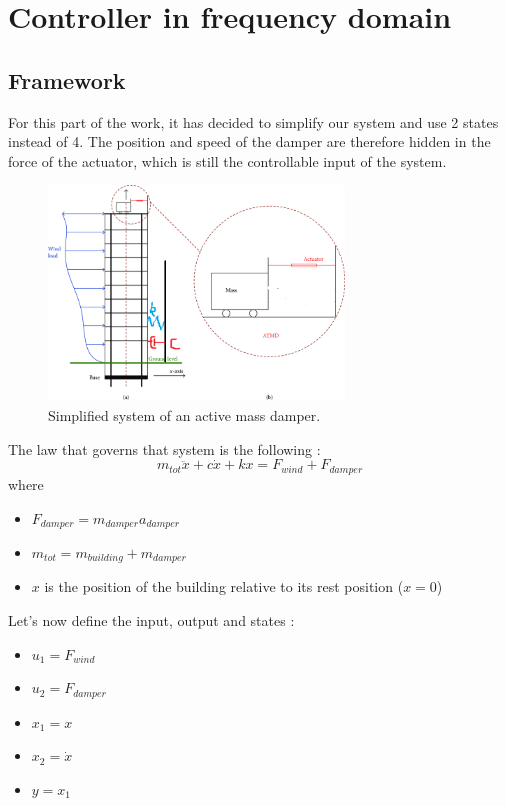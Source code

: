 \section{Controller in frequency domain}

\subsection{Framework}
For this part of the work, it has decided to simplify our system and use 2 states instead of 4. The position and speed of the damper are therefore hidden in the force of the actuator, which is still the controllable input of the system.
\begin{figure}[H]
    \centering
    \includegraphics[width=0.7\textwidth]{resources/png/simplified-system.png}
    \caption{Simplified system of an active mass damper.}
    \label{fig:simplified-system}
\end{figure}
The law that governs that system is the following : 
$$
m_{tot}\ddot{x} + c\dot{x} + kx = F_{wind} + F_{damper}
$$
where
\begin{itemize}
    \item $F_{damper} = m_{damper}a_{damper}$
    \item $m_{tot} = m_{building} + m_{damper}$
    \item $x$ is the position of the building relative to its rest position ($x = 0$)
\end{itemize}
Let's now define the input, output and states : 
\begin{itemize}
    \item $u_1 = F_{wind}$
    \item $u_2 = F_{damper}$
    \item $x_1 = x$
    \item $x_2 = \dot{x}$
    \item $y = x_1$ 
\end{itemize}
